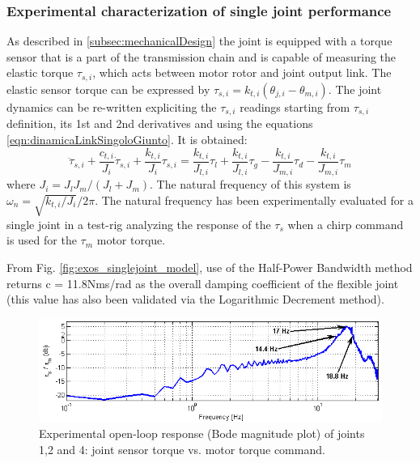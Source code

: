 \documentclass[journal]{IEEEtran}
\newcommand{\point}[1]{  \paragraph{\footnotesize \bf[#1]} }
\newcommand{\hldone}[1]{\colorbox{green}{#1}}
\begin{document}
\subsubsection{Experimental characterization of single joint performance}
As described in \ref{subsec:mechanicalDesign} the joint is equipped with a torque sensor that is a part of the transmission chain and is capable of measuring the elastic torque $\tau_{s,i}$, which acts between motor rotor and joint output link. The elastic sensor torque can be expressed by $\tau_{s,i} = k_{t,i} (\theta_{j,i}-\theta_{m,i})$. The joint dynamics can be re-written expliciting the $\tau_{s,i}$ readings starting from  $\tau_{s,i}$ definition, its 1st and 2nd derivatives and using the equations  \ref{eqn:dinamicaLinkSingoloGiunto}. It is obtained:
\begin{equation}
\label{eqn:dinamicaSensoreCoppia}
\ddot{\tau}_{s,i} + \frac{c_{t,i}}{J_i}\dot{\tau}_{s,i} + \frac{k_{t,i}}{J_i}\tau_{s,i}= \frac{k_{t,i}}{J_{l,i}}\tau_l + \frac{k_{t,i}}{J_{l,i}}\tau_g - \frac{k_{t,i}}{J_{m,i}}\tau_d - \frac{k_{t,i}}{J_{m,i}}\tau_m
\end{equation}
where $J_i = J_l J_m /(J_l+J_m)$. The natural frequency of this system is $\omega_n = \sqrt{k_{t,i} /J_i } /2\pi$. The natural frequency has been experimentally evaluated for a single joint in a test-rig analyzing the response of the $\tau_s$ when a chirp command is used for the $\tau_m$ motor torque. 
\par From Fig. \ref{fig:exos_singlejoint_model}, use of the Half-Power Bandwidth method returns c = 11.8Nms/rad as the overall damping coefficient of the flexible joint (this value has also been validated via the Logarithmic Decrement method).
\begin{figure}[ht]
	\centering
	\includegraphics[width=1\columnwidth]{OpenLoopJointBode}
	\caption{Experimental open-loop response (Bode magnitude plot) of joints 1,2 and 4: joint sensor torque vs. motor torque command.}
	\label{fig:OpenLoopJointBode}
\end{figure}
\end{document}
